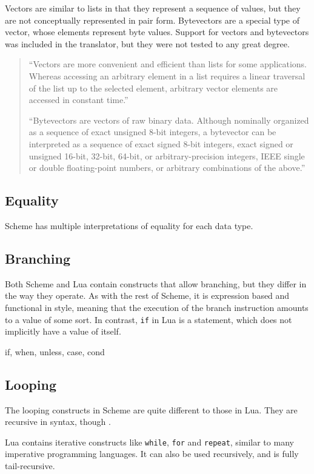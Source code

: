 Vectors are similar to lists in that they represent a sequence of values, but
they are not conceptually represented in pair form. Bytevectors are a special
type of vector, whose elements represent byte values. Support for vectors and
bytevectors was included in the translator, but they were not tested to any
great degree.
\begin{quotation}
``Vectors are more convenient and efficient than lists for some applications.
Whereas accessing an arbitrary element in a list requires a linear traversal of
the list up to the selected element, arbitrary vector elements are accessed in
constant time.''~\cite[Sec~6.9]{tspl}

``Bytevectors are vectors of raw binary data. Although nominally organized as a
sequence of exact unsigned 8-bit integers, a bytevector can be interpreted as a
sequence of exact signed 8-bit integers, exact signed or unsigned 16-bit,
32-bit, 64-bit, or arbitrary-precision integers, IEEE single or double
floating-point numbers, or arbitrary combinations of the
above.''~\cite[Sec~6.10]{tspl}
\end{quotation} 

\subsection{Equality}

Scheme has multiple interpretations of equality for each data type.

\subsection{Branching}

Both Scheme and Lua contain constructs that allow branching, but they differ in
the way they operate. As with the rest of Scheme, it is expression based and
functional in style, meaning that the execution of the branch instruction
amounts to a value of some sort. In contrast, \texttt{if} in Lua is a statement,
which does not implicitly have a value of itself.

if, when, unless, case, cond

\subsection{Looping}

The looping constructs in Scheme are quite different to those in Lua. They are
recursive in syntax, though .

Lua contains iterative constructs like \texttt{while}, \texttt{for} and
\texttt{repeat}, similar to many imperative programming languages. It can also
be used recursively, and is fully tail-recursive.

